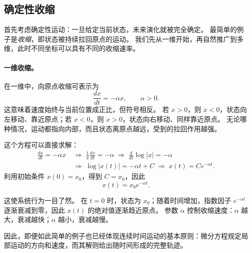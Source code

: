 \subsection{确定性收缩}

首先考虑确定性运动：一旦给定当前状态，未来演化就被完全确定。
最简单的例子是\emph{收缩}，即状态被持续拉回原点的运动。
我们先从一维开始，再自然推广到多维，此时不同坐标可以具有不同的收缩速率。

\paragraph{一维收缩。}
在一维中，向原点收缩可表示为
\[
\frac{dx}{dt}=-\alpha x,
\qquad \alpha>0.
\]
这意味着速度始终与当前位置成正比，但符号相反。
若 $x>0$，则 $\dot{x}<0$，状态向左移动、靠近原点；若 $x<0$，则 $\dot{x}>0$，状态向右移动、同样靠近原点。
无论哪种情况，运动都指向内部，而且状态离原点越远，受到的拉回作用越强。

这个方程可以直接求解：
\[
\begin{aligned}
\frac{dx}{dt}=-\alpha x
&\;\Longrightarrow\;
\frac{1}{x}\frac{dx}{dt}=-\alpha
\;\Longrightarrow\;
\frac{d}{dt}\log|x|=-\alpha \\[4pt]
&\;\Longrightarrow\;
\log|x(t)|=-\alpha t + C
\;\Longrightarrow\;
x(t)=Ce^{-\alpha t}.
\end{aligned}
\]
利用初始条件 $x(0)=x_0$，得到 $C=x_0$，因此
\[
\boxed{
x(t)=x_0e^{-\alpha t}.
}
\]

这使系统行为一目了然。
在 $t=0$ 时，状态为 $x_0$；随着时间增加，指数因子 $e^{-\alpha t}$ 逐渐衰减到零，因此 $x(t)$ 的绝对值逐渐趋近原点。
参数 $\alpha$ 控制收缩速度：$\alpha$ 越大，衰减越快；$\alpha$ 越小，衰减越慢。

因此，即便如此简单的例子也已经体现连续时间运动的基本原则：微分方程规定局部运动的方向和速度，而其解则给出随时间形成的完整轨迹。

